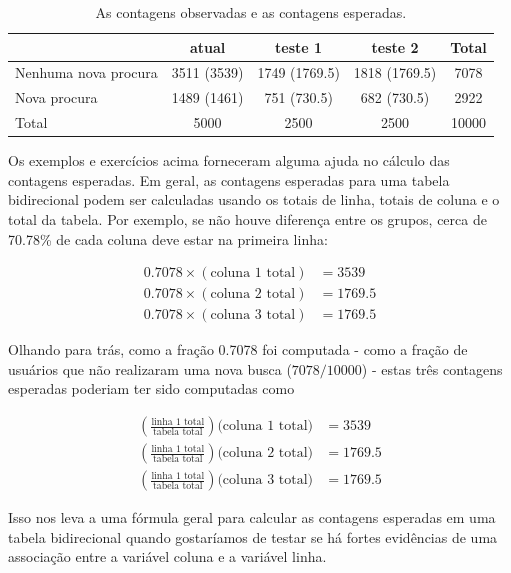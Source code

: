 \documentclass[
]{book}
\theoremstyle{definition}
\theoremstyle{definition}
\theoremstyle{definition}
\theoremstyle{definition}
\theoremstyle{remark}
\begin{document}
\begin{table}

\caption{\label{tab:googleSearchAlgorithmByAlgorithmAndPerformanceWithExpectedCounts}As contagens observadas e as contagens esperadas.}
\centering
\begin{tabular}[t]{l|c|c|c|c}
\hline
  & atual & teste 1 & teste 2 & Total\\
\hline
Nenhuma nova procura & 3511 (3539) & 1749 (1769.5) & 1818 (1769.5) & 7078\\
\hline
Nova procura & 1489 (1461) & 751 (730.5) & 682 (730.5) & 2922\\
\hline
Total & 5000 & 2500 & 2500 & 10000\\
\hline
\end{tabular}
\end{table}

Os exemplos e exercícios acima forneceram alguma ajuda no cálculo das contagens esperadas. Em geral, as contagens esperadas para uma tabela bidirecional podem ser calculadas usando os totais de linha, totais de coluna e o total da tabela. Por exemplo, se não houve diferença entre os grupos, cerca de 70.78\% de cada coluna deve estar na primeira linha:

\begin{align*}
0.7078\times (\text{coluna 1 total}) &= 3539 \\
0.7078\times (\text{coluna 2 total}) &= 1769.5 \\
0.7078\times (\text{coluna 3 total}) &= 1769.5
\end{align*}

Olhando para trás, como a fração 0.7078 foi computada - como a fração de usuários que não realizaram uma nova busca (\(7078/10000\)) - estas três contagens esperadas poderiam ter sido computadas como

\begin{align*}
\left(\frac{\text{linha 1 total}}{\text{tabela total}}\right)\text{(coluna 1 total)} &= 3539 \\
\left(\frac{\text{linha 1 total}}{\text{tabela total}}\right)\text{(coluna 2 total)} &= 1769.5 \\
\left(\frac{\text{linha 1 total}}{\text{tabela total}}\right)\text{(coluna 3 total)} &= 1769.5
\end{align*}

Isso nos leva a uma fórmula geral para calcular as contagens esperadas em uma tabela bidirecional quando gostaríamos de testar se há fortes evidências de uma associação entre a variável coluna e a variável linha.
\end{document}
